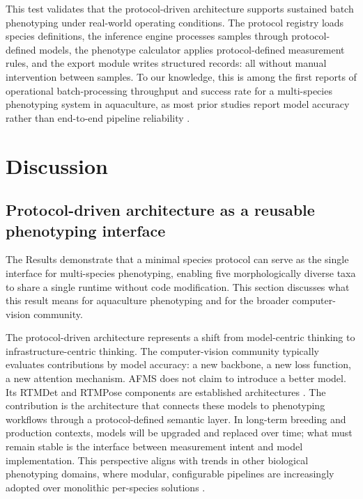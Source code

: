 \documentclass[final,3p,times]{elsarticle}
\begin{document}
This test validates that the protocol-driven architecture supports sustained batch phenotyping under real-world operating conditions. The protocol registry loads species definitions, the inference engine processes samples through protocol-defined models, the phenotype calculator applies protocol-defined measurement rules, and the export module writes structured records: all without manual intervention between samples. To our knowledge, this is among the first reports of operational batch-processing throughput and success rate for a multi-species phenotyping system in aquaculture, as most prior studies report model accuracy rather than end-to-end pipeline reliability \citep{navarro2016imafish,he2024measurement,tonachella2022fishial}.

\section{Discussion}

\subsection{Protocol-driven architecture as a reusable phenotyping interface}

The Results demonstrate that a minimal species protocol can serve as the single interface for multi-species phenotyping, enabling five morphologically diverse taxa to share a single runtime without code modification. This section discusses what this result means for aquaculture phenotyping and for the broader computer-vision community.

The protocol-driven architecture represents a shift from model-centric thinking to infrastructure-centric thinking. The computer-vision community typically evaluates contributions by model accuracy: a new backbone, a new loss function, a new attention mechanism. AFMS does not claim to introduce a better model. Its RTMDet and RTMPose components are established architectures \citep{lyu2022rtmdet,jiang2023rtmpose}. The contribution is the architecture that connects these models to phenotyping workflows through a protocol-defined semantic layer. In long-term breeding and production contexts, models will be upgraded and replaced over time; what must remain stable is the interface between measurement intent and model implementation. This perspective aligns with trends in other biological phenotyping domains, where modular, configurable pipelines are increasingly adopted over monolithic per-species solutions \citep{gonzalez2023phytooracle}.
\end{document}

